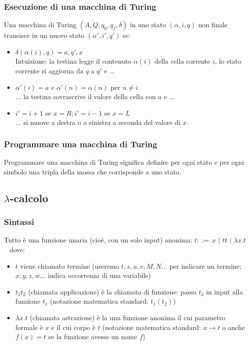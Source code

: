 \documentclass{article}
\begin{document}
\subsubsection{Esecuzione di una macchina di Turing}
Una macchina di Turing $(A, Q, q_0, q_f,\delta )$ in uno stato $(\alpha, i , q)$ non finale {\color{red}transisce} in un nuovo stato $(\alpha', i', q')$ se:
\begin{itemize}
    \item $\delta(\alpha(i), q) = a, q', x$ \\ Intuizione: la testina {\color{red} legge} il contenuto $\alpha(i)$ della cella corrente $i$, lo stato corrente {\color{red} si aggiorna} da $q$ a $q'$ e ...
    \item $\alpha'(i) = a$ e $\alpha'(n)=\alpha(n)$ per $n\not = i$\\ ... la testina {\color{red} sovrascrive} il valore della cella con $a$ e ...
    \item $i' = i+1$ se $x = R; i' = i-1$ se $x = L$ \\ ... {\color{red} si muove} a destra o a sinistra a seconda del valore di $x$.
\end{itemize}

\subsubsection{Programmare una macchina di Turing}
Programmare una macchina di Turing significa definire per ogni stato e per ogni simbolo una tripla della mossa che corrisponde a uno stato.

\subsection{$\lambda$-calcolo}
\subsubsection{Sintassi}
Tutto è una funzione unaria (cioè, con un solo input) anonima:
{
\centering
$t::= \,x\,\, |\,\,tt\,\,|\,\,\lambda x.t$\
}
dove:
\begin{itemize}
    \item $t$ viene chiamato {\color{red}termine} (useremo $t, s, u, v, M, N$... per indicare un termine; $x, y, z, w$... indica {\color{red}occorrenza di una variabile})
    \item $t_1t_2$ (chiamata {\color{red} applicazione}) è la {\color{red}chiamata di funzione}: passo $t_2$ in input alla funzione $t_1$ (notazione matematica standard: $t_1(t_2)$)
    \item $\lambda x.t$ (chiamata {\color{red} astrazione}) è la una {\color{red}funzione anonima} il cui {\color{red}parametro formale} è $x$ e il cui {\color{red}corpo} è $t$ (notazione matematica standard: $x \to t$ o anche $f(x) = t$ se la funzione avesse un nome $f$)
\end{itemize}
\end{document}

